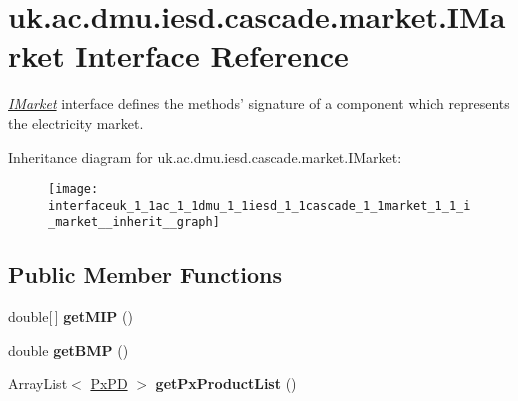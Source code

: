 \hypertarget{interfaceuk_1_1ac_1_1dmu_1_1iesd_1_1cascade_1_1market_1_1_i_market}{\section{uk.\-ac.\-dmu.\-iesd.\-cascade.\-market.\-I\-Market Interface Reference}
\label{interfaceuk_1_1ac_1_1dmu_1_1iesd_1_1cascade_1_1market_1_1_i_market}
}


{\itshape \hyperlink{interfaceuk_1_1ac_1_1dmu_1_1iesd_1_1cascade_1_1market_1_1_i_market}{I\-Market}} interface defines the methods' signature of a component which represents the electricity market.  




Inheritance diagram for uk.\-ac.\-dmu.\-iesd.\-cascade.\-market.\-I\-Market\-:\nopagebreak
\begin{figure}[H]
\begin{center}
\leavevmode
\texttt{[image: interfaceuk\_1\_1ac\_1\_1dmu\_1\_1iesd\_1\_1cascade\_1\_1market\_1\_1\_i\_market\_\_inherit\_\_graph]}
\end{center}
\end{figure}
\subsection*{Public Member Functions}
\begin{DoxyCompactItemize}
\item 
\hypertarget{interfaceuk_1_1ac_1_1dmu_1_1iesd_1_1cascade_1_1market_1_1_i_market_a3a625342dd9d2d4d5258e61ba61ea379}{double\mbox{[}$\,$\mbox{]} {\bfseries get\-M\-I\-P} ()}\label{interfaceuk_1_1ac_1_1dmu_1_1iesd_1_1cascade_1_1market_1_1_i_market_a3a625342dd9d2d4d5258e61ba61ea379}

\item 
\hypertarget{interfaceuk_1_1ac_1_1dmu_1_1iesd_1_1cascade_1_1market_1_1_i_market_a9752e81b054b2fe4aa6f595015727716}{double {\bfseries get\-B\-M\-P} ()}\label{interfaceuk_1_1ac_1_1dmu_1_1iesd_1_1cascade_1_1market_1_1_i_market_a9752e81b054b2fe4aa6f595015727716}

\item 
\hypertarget{interfaceuk_1_1ac_1_1dmu_1_1iesd_1_1cascade_1_1market_1_1_i_market_ae3198be0c1362ae0805d60f011302b04}{Array\-List$<$ \hyperlink{classuk_1_1ac_1_1dmu_1_1iesd_1_1cascade_1_1market_1_1data_1_1_px_p_d}{Px\-P\-D} $>$ {\bfseries get\-Px\-Product\-List} ()}\label{interfaceuk_1_1ac_1_1dmu_1_1iesd_1_1cascade_1_1market_1_1_i_market_ae3198be0c1362ae0805d60f011302b04}

\end{DoxyCompactItemize}



